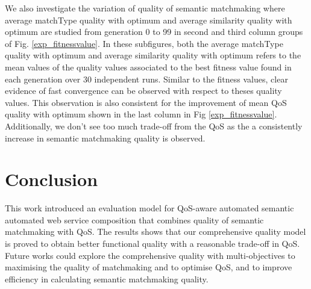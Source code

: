 \documentclass{llncs}
\begin{document}
We also investigate the variation of quality of semantic matchmaking where average matchType quality with optimum and average similarity quality with optimum are studied from generation 0 to 99 in second and third column groups of Fig. \ref{exp_fitnessvalue}. In these subfigures, both the average matchType quality with optimum and average similarity quality with optimum refers to the mean values of the quality values associated to the best fitness value found in each generation over 30 independent runs. Similar to the fitness values, clear evidence of fast convergence can be observed with respect to theses quality values. This observation is also consistent for the improvement of mean QoS quality with optimum shown in the last column in Fig \ref{exp_fitnessvalue}. Additionally, we don't see too much trade-off from the QoS as the a consistently increase in semantic matchmaking quality is observed.

\vspace{-0.5cm}
\section{Conclusion}\label{conclusion}
This work introduced an evaluation model for QoS-aware automated semantic automated web service composition that combines quality of semantic matchmaking with QoS. The results shows that our comprehensive quality model is proved to obtain better functional quality with a reasonable trade-off in QoS. Future works could explore the comprehensive quality with multi-objectives to maximising the quality of matchmaking and to optimise QoS, and to improve efficiency in calculating semantic matchmaking quality.
\vspace{-0.5cm}


\end{document}
